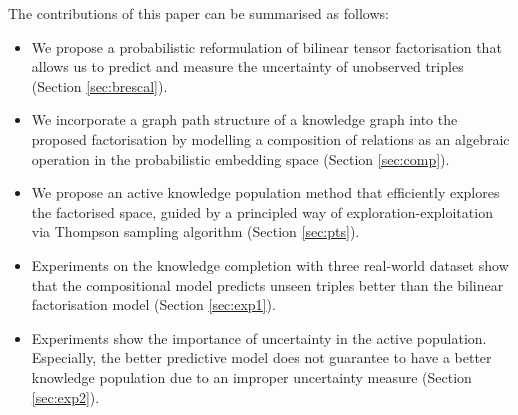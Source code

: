 The contributions of this paper can be summarised as follows:
\begin{itemize}
\item We propose a probabilistic reformulation of bilinear tensor factorisation that allows us to predict and measure the uncertainty of unobserved triples (Section \ref{sec:brescal}).
\item We incorporate a graph path structure of a knowledge graph into the proposed factorisation by modelling a composition of relations as an algebraic operation in the probabilistic embedding space (Section \ref{sec:comp}).
\item We propose an active knowledge population method that efficiently explores the factorised space, guided by a principled way of exploration-exploitation via Thompson sampling algorithm (Section \ref{sec:pts}).
\item Experiments on the knowledge completion with three real-world dataset show that the compositional model predicts unseen triples better than the bilinear factorisation model (Section \ref{sec:exp1}).
\item Experiments show the importance of uncertainty in the active population. Especially, the better predictive model does not guarantee to have a better knowledge population due to an improper uncertainty measure (Section \ref{sec:exp2}).
\end{itemize}

